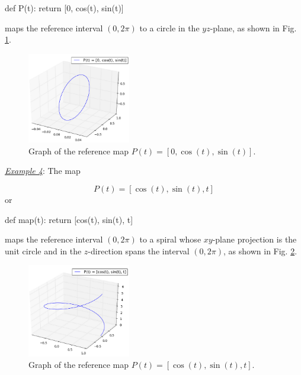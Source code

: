 \begin{bluecode}
def P(t): return [0, cos(t), sin(t)]
\end{bluecode}
maps the reference interval $(0, 2\pi)$ to a circle in the 
$yz$-plane, as shown in Fig. \ref{fig:paramcu3}.

\newpage
\begin{figure}[!ht]
\begin{center}
\includegraphics[width=0.4\textwidth]{img/paramcu3.png}
\end{center}
\vspace{-6mm}
\caption{Graph of the reference map $P(t) = [0, \cos(t), \sin(t)]$.}
\label{fig:paramcu3}
\end{figure}
\noindent
\underline{\em Example 4}: The map

$$
P(t) = [\cos(t), \sin(t), t]
$$
or

\begin{bluecode}
def map(t):
    return [cos(t), sin(t), t]
\end{bluecode}
maps the reference interval $(0, 2\pi)$ to a spiral whose 
$xy$-plane projection is the unit circle and in the $z$-direction 
spans the interval $(0, 2\pi)$, as shown in Fig. \ref{fig:paramcu4}.

\begin{figure}[!ht]
\begin{center}
\includegraphics[width=0.4\textwidth]{img/paramcu4.png}
\end{center}
\vspace{-6mm}
\caption{Graph of the reference map $P(t) = [\cos(t), \sin(t), t]$.}
\label{fig:paramcu4}
\end{figure}
\noindent

